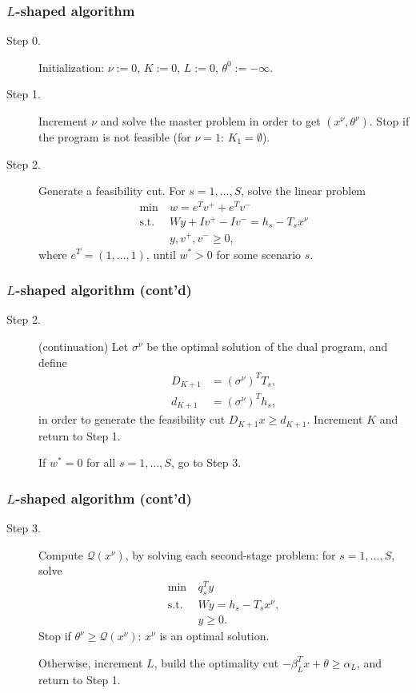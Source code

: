 \documentclass[aspectratio=169]{beamer}
\begin{document}
\begin{frame}
\frametitle{$L$-shaped algorithm}
	
\begin{description}
\item[Step 0.]  {\red Initialization}:
$\nu := 0$, $K := 0$, $L:= 0$, $\theta^{0} := -\infty$.
\item[Step 1.] Increment $\nu$ and {\red solve the master problem} in order to get $(x^{\nu}, \theta^{\nu})$.
Stop if the program is not feasible (for $\nu = 1$: $K_1 = \emptyset$).
\item[Step 2.]
Generate a {\red feasibility cut}.
For $s = 1,\ldots,S$, solve the linear problem
\begin{align*}
\min\ & w = e^Tv^+ + e^Tv^- \\
\text{s.t. } & Wy + Iv^+ - Iv^- = h_s - T_sx^{\nu} \\
& y, v^+, v^- \geq 0,
\end{align*}
where $e^T = (1,\ldots,1)$, until $w^* > 0$ for some scenario $s$.
\end{description}
	
\end{frame}

\begin{frame}
\frametitle{$L$-shaped algorithm (cont'd)}
	
\begin{description}
\item[Step 2.] (continuation)
Let $\sigma^{\nu}$ be the optimal solution of the dual program, and define
\begin{align*}
D_{K+1} &= (\sigma^{\nu})^TT_s, \\
d_{K+1} &= (\sigma^{\nu})^Th_s,
\end{align*}
in order to generate the feasibility cut $D_{K+1} x \geq d_{K+1}$.
Increment $K$ and return to Step 1.

\mbox{}
		
If $w^* = 0$ for all $s = 1, \ldots, S$, go to Step 3.
\end{description}
	
\end{frame}

\begin{frame}
\frametitle{$L$-shaped algorithm (cont'd)}
	
\begin{description}
\item[Step 3.]
Compute $\mathcal{Q}(x^{\nu})$, by solving each second-stage problem: for $s = 1,\ldots,S$, solve
\begin{align*}
\min\ & q^T_sy \\
\text{s.t. } & Wy = h_s-T_sx^{\nu},\\
& y \geq 0.
\end{align*}
Stop if $\theta^{\nu} \geq \mathcal{Q}(x^{\nu})$: $x^{\nu}$ is an optimal solution.
		
Otherwise, increment $L$, build the optimality cut $-\beta_L^T x + \theta \geq \alpha_L$, and return to Step 1.
\end{description}
	
\end{frame}
\end{document}
